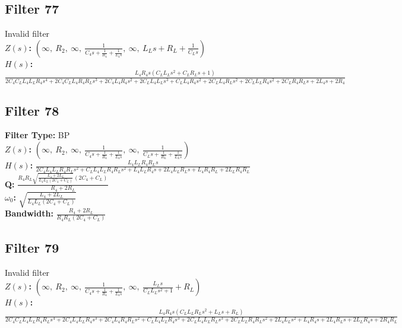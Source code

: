 \documentclass{article}
\begin{document}
\subsection*{Filter 77}
Invalid filter \\ 
\textbf{$Z(s)$:} $\left( \infty, \  R_{2}, \  \infty, \  \frac{1}{C_{4} s + \frac{1}{R_{4}} + \frac{1}{L_{4} s}}, \  \infty, \  L_{L} s + R_{L} + \frac{1}{C_{L} s}\right)$ \\ 
\textbf{$H(s)$:} $\frac{L_{4} R_{4} s \left(C_{L} L_{L} s^{2} + C_{L} R_{L} s + 1\right)}{2 C_{4} C_{L} L_{4} L_{L} R_{4} s^{4} + 2 C_{4} C_{L} L_{4} R_{4} R_{L} s^{3} + 2 C_{4} L_{4} R_{4} s^{2} + 2 C_{L} L_{4} L_{L} s^{3} + C_{L} L_{4} R_{4} s^{2} + 2 C_{L} L_{4} R_{L} s^{2} + 2 C_{L} L_{L} R_{4} s^{2} + 2 C_{L} R_{4} R_{L} s + 2 L_{4} s + 2 R_{4}}$ \\ 
\subsection*{Filter 78}
\textbf{Filter Type:} BP \\ 
\textbf{$Z(s)$:} $\left( \infty, \  R_{2}, \  \infty, \  \frac{1}{C_{4} s + \frac{1}{R_{4}} + \frac{1}{L_{4} s}}, \  \infty, \  \frac{1}{C_{L} s + \frac{1}{R_{L}} + \frac{1}{L_{L} s}}\right)$ \\ 
\textbf{$H(s)$:} $\frac{L_{4} L_{L} R_{4} R_{L} s}{2 C_{4} L_{4} L_{L} R_{4} R_{L} s^{2} + C_{L} L_{4} L_{L} R_{4} R_{L} s^{2} + L_{4} L_{L} R_{4} s + 2 L_{4} L_{L} R_{L} s + L_{4} R_{4} R_{L} + 2 L_{L} R_{4} R_{L}}$ \\ 
\textbf{Q:} $\frac{R_{4} R_{L} \sqrt{\frac{L_{4} + 2 L_{L}}{L_{4} L_{L} \left(2 C_{4} + C_{L}\right)}} \left(2 C_{4} + C_{L}\right)}{R_{4} + 2 R_{L}}$ \\ 
\textbf{$\omega_0$:} $\sqrt{\frac{L_{4} + 2 L_{L}}{L_{4} L_{L} \left(2 C_{4} + C_{L}\right)}}$ \\ 
\textbf{Bandwidth:} $\frac{R_{4} + 2 R_{L}}{R_{4} R_{L} \left(2 C_{4} + C_{L}\right)}$ \\ 
\subsection*{Filter 79}
Invalid filter \\ 
\textbf{$Z(s)$:} $\left( \infty, \  R_{2}, \  \infty, \  \frac{1}{C_{4} s + \frac{1}{R_{4}} + \frac{1}{L_{4} s}}, \  \infty, \  \frac{L_{L} s}{C_{L} L_{L} s^{2} + 1} + R_{L}\right)$ \\ 
\textbf{$H(s)$:} $\frac{L_{4} R_{4} s \left(C_{L} L_{L} R_{L} s^{2} + L_{L} s + R_{L}\right)}{2 C_{4} C_{L} L_{4} L_{L} R_{4} R_{L} s^{4} + 2 C_{4} L_{4} L_{L} R_{4} s^{3} + 2 C_{4} L_{4} R_{4} R_{L} s^{2} + C_{L} L_{4} L_{L} R_{4} s^{3} + 2 C_{L} L_{4} L_{L} R_{L} s^{3} + 2 C_{L} L_{L} R_{4} R_{L} s^{2} + 2 L_{4} L_{L} s^{2} + L_{4} R_{4} s + 2 L_{4} R_{L} s + 2 L_{L} R_{4} s + 2 R_{4} R_{L}}$ \\ 
\end{document}
